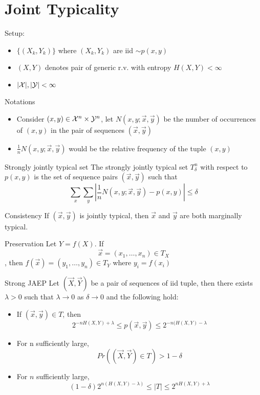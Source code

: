 \documentclass[../main.tex]{subfiles}
\begin{document}
    
\section{Joint Typicality}
Setup:
\begin{itemize}
    \item $\{(X_k, Y_k)\}$ where $(X_k, Y_k)$ are iid $\sim p(x,y)$
    \item $(X,Y)$ denotes pair of generic r.v. with entropy $H(X,Y)<\infty$
    \item $|\mathcal{X}|,|\mathcal{Y}| < \infty$
\end{itemize}
Notations
\begin{itemize}
    \item Consider $(x,y)\in \mathcal{X}^n\times \mathcal{Y}^n$, let $N(x,y;\vec x,\vec y)$ be the number of occurrences of $(x,y)$ in the pair of sequences $(\vec x, \vec y)$
    \item $\frac{1}{n}N(x,y;\vec x,\vec y)$ would be the relative frequency of the tuple $(x,y)$
\end{itemize}
\begin{pbox}{Strongly jointly typical set}
The strongly jointly typical set $T^n_{\delta}$ with respect to $p(x,y)$ is the set of sequence pairs $(\vec x, \vec y)$ such that \[
\sum_x \sum_y|\frac{1}{n}N(x,y;\vec x,\vec y)-p(x,y)|\leq \delta
\]    
\end{pbox}
\begin{bbox}{Consistency}
    If $(\vec x, \vec y)$ is jointly typical, then $\vec x$ and $\vec y$ are both marginally typical.
\end{bbox}
\begin{bbox}{Preservation}
    Let $Y=f(X)$. If \[
    \vec x =(x_1,\dots,x_n)\in T_X
    \], then $f(\vec x)=(y_1,\dots,y_n)\in T_Y$ where $y_i=f(x_i)$
\end{bbox}
\begin{bbox}{Strong JAEP}
    Let $(\vec X,\vec Y)$ be a pair of sequences of iid tuple, then there exists $\lambda>0$ such that $\lambda\to 0$ as $\delta\to 0$ and the following hold:
    \begin{itemize}
        \item If $(\vec x,\vec y)\in T$, then \[
        2^{-nH(X,Y)+\lambda}\leq p(\vec x,\vec y)\leq 2^{-n(H(X,Y)-\lambda}
        \] 
        \item For n sufficiently large, \[
        Pr((\vec X,\vec Y) \in T)>1-\delta
        \]
        \item For $n$ sufficiently large, \[
        (1-\delta)2^{n(H(X,Y)-\lambda)}\leq |T|\leq 2^{nH(X,Y)+\lambda}
        \]
    \end{itemize}
\end{bbox}
\end{document}
